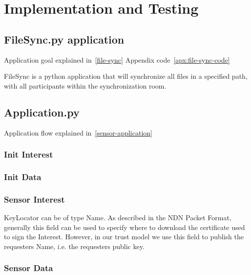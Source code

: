 \chapter{Implementation and Testing}

\section{FileSync.py application}
Application goal explained in~\autoref{file-sync}
Appendix code~\autoref{apx:file-sync-code}

FileSync is a python application that will synchronize all files in a specified path, with all participants within the synchronization room.

\section{Application.py}
Application flow explained in~\autoref{sensor-application}

\subsection{Init Interest}

\subsection{Init Data}

\subsection{Sensor Interest}
KeyLocator can be of type Name. 
As described in the \gls{NDN} Packet Format, generally this field can be used to specify where to download the certificate used to sign the Interest.
However, in our trust model we use this field to publish the requesters Name, i.e. the requesters public key. 


\subsection{Sensor Data}